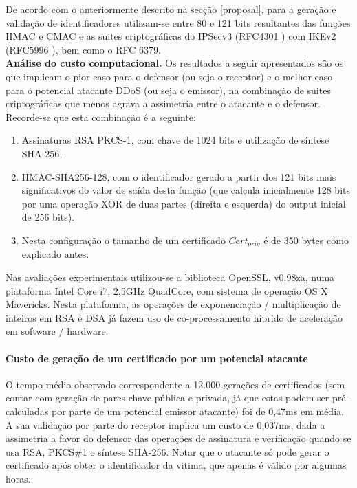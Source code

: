 De acordo com o anteriormente descrito na secção \ref{proposal}, para a geração e validação de identificadores
 utilizam-se entre 80 e 121 bits resultantes das funções HMAC e CMAC e as suites
 criptográficas do IPSecv3 (RFC4301 \cite{rfc4301})
com IKEv2 (RFC5996 \cite{rfc5996}), bem como o RFC 6379\cite{rfc6379}.
\\

\noindent
\textbf{Análise do custo computacional.}
Os resultados a seguir apresentados são os que implicam o pior caso para o defensor (ou seja o receptor) e o melhor caso
para o potencial atacante DDoS (ou seja o emissor), na combinação de suites criptográficas que menos agrava
a assimetria entre o atacante e o defensor. Recorde-se que esta combinação é a seguinte:
\begin{enumerate}
\item Assinaturas RSA PKCS-1, com chave de 1024 bits e utilização de síntese SHA-256,
\item HMAC-SHA256-128, com o identificador gerado a partir dos 121 bits mais significativos do valor de saída desta função
(que calcula inicialmente 128 bits por uma operação XOR de duas partes (direita e esquerda) do output inicial de 256 bits).
\item Nesta configuração o tamanho de um certificado $Cert_{orig}$ é de 350 bytes como explicado antes.
\end{enumerate}

Nas avaliações experimentais utilizou-se a biblioteca
OpenSSL, v0.98za, numa plataforma Intel Core i7, 2,5GHz QuadCore,
com sistema de operação OS X Mavericks.
Nesta plataforma, as operações de exponenciação / multiplicação de inteiros em
RSA e DSA já fazem uso de co-processamento híbrido de aceleração em software / hardware.

\paragraph{\textbf{Custo de geração de um certificado por um potencial atacante}}
O tempo médio observado correspondente a 12.000 gerações de certificados (sem contar com geração de pares chave pública e privada, já que estas podem ser pré-calculadas por parte de um potencial emissor atacante) foi de 0,47ms em média. A sua validação por parte do receptor implica um custo de 0,037ms, dada a assimetria a favor do defensor das operações de assinatura e verificação quando se usa RSA, PKCS\#1 e síntese SHA-256.
Notar que o atacante só pode gerar o certificado após obter o identificador da vitima,
que apenas é válido por algumas horas.

